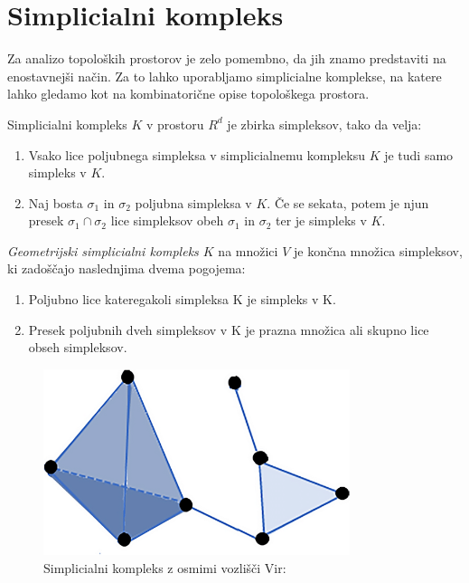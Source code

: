 \section{Simplicialni kompleks}
Za analizo topoloških prostorov je zelo pomembno, da jih znamo predstaviti na enostavnejši način. Za to lahko uporabljamo simplicialne komplekse, na katere lahko gledamo kot na kombinatorične opise topološkega prostora. \\
\begin{definicija}
Simplicialni kompleks \(K\) v prostoru \(R^d\) je zbirka simpleksov, tako da velja:
    \begin{enumerate}
    \item Vsako lice poljubnega simpleksa v simplicialnemu kompleksu \(K\) je tudi samo simpleks v \(K\).
    \item Naj bosta \(\sigma_1\) in \(\sigma_2\) poljubna simpleksa v \(K\). \v{C}e se sekata, potem je njun presek \(\sigma_1 \cap \sigma_2\) lice simpleksov obeh \(\sigma_1\) in \(\sigma_2\) ter je simpleks v \(K\).
\end{enumerate}
\end{definicija}

\begin{definicija}
    \textit{Geometrijski simplicialni kompleks $K$} na množici $V$ je končna množica simpleksov, ki zadoščajo naslednjima dvema pogojema:
    \begin{enumerate}
        \item Poljubno lice kateregakoli simpleksa K je simpleks v K.
        \item Presek poljubnih dveh simpleksov v K je prazna množica ali skupno lice obseh simpleksov.
    \end{enumerate}
\end{definicija}

\begin{figure}[H]
    \centering
    \includegraphics[width=0.8\textwidth]{resources/Simplicial-complex-eight-vertices.png}
    \caption{Simplicialni kompleks z osmimi vozlišči Vir: \cite{researchgate_simplicial_complex}}
    \label{fig:your-label}
\end{figure}

